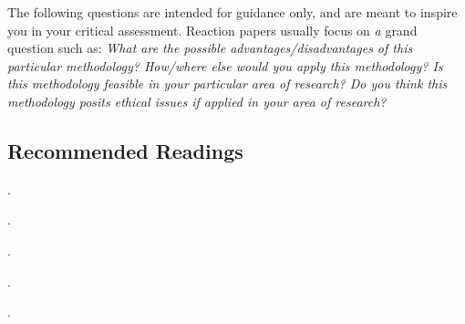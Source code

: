 \documentclass[letterpaper]{article}
\renewenvironment{itemize}{
  \begin{list}{}{
    \setlength{\leftmargin}{1.5em}
  }
}{
  \end{list}
}
\begin{document}
\begin{itemize}
  \item[\Pointinghand] The following questions are intended for guidance only, and are meant to inspire you in your critical assessment. Reaction papers usually focus on \emph{a} grand question such as: \emph{What are the possible advantages/disadvantages of this particular methodology? How/where else would you apply this methodology? Is this methodology feasible in your particular area of research? Do you think this methodology posits ethical issues if applied in your area of research?}
\end{itemize}


\subsection*{Recommended Readings}

\begin{itemize} 

        \item[$\diamond$] \href{https://search-ebscohost-com.ezproxy.utu.fi/login.aspx?direct=true&db=nlebk&AN=516924&site=ehost-live}{}.

        \item[$\diamond$] \href{https://doi-org.ezproxy.utu.fi/10.1017/CBO9781139084444}{}.

        \item[$\diamond$] \href{https://doi-org.ezproxy.utu.fi/10.1017/CBO9780511762888}{}.

        \item[$\diamond$] \href{https://doi.org/10.1016/j.electstud.2022.102497}{}.

        \item[$\diamond$] \href{https://www.cambridge.org/core/journals/political-analysis/article/estimating-and-using-individual-marginal-component-effects-from-conjoint-experiments/FE284F17AB91A18673CC33276FF45D34}{}.


        



\end{itemize} 
\end{document}
